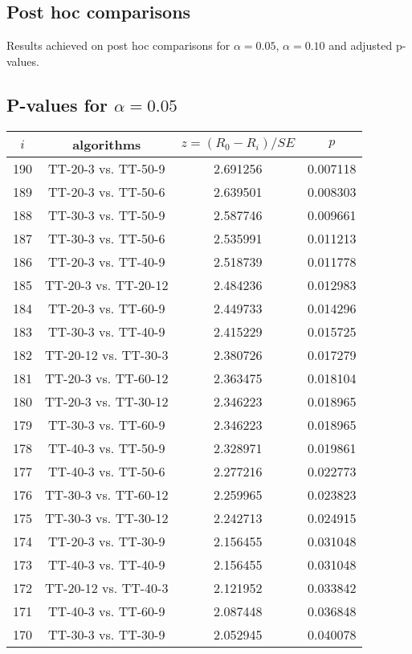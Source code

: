 \documentclass[a4paper,10pt]{article}
\begin{document}
\begin{landscape}
\section{Post hoc comparisons}

Results achieved on post hoc comparisons for $\alpha = 0.05$, $\alpha = 0.10$ and adjusted p-values.

\subsection{P-values for $\alpha=0.05$}

\begin{table}[!htp]
\centering\scriptsize
\begin{tabular}{cccc}
$i$&algorithms&$z=(R_0 - R_i)/SE$&$p$\\
\hline190&TT-20-3 vs. TT-50-9&2.691256&0.007118\\
189&TT-20-3 vs. TT-50-6&2.639501&0.008303\\
188&TT-30-3 vs. TT-50-9&2.587746&0.009661\\
187&TT-30-3 vs. TT-50-6&2.535991&0.011213\\
186&TT-20-3 vs. TT-40-9&2.518739&0.011778\\
185&TT-20-3 vs. TT-20-12&2.484236&0.012983\\
184&TT-20-3 vs. TT-60-9&2.449733&0.014296\\
183&TT-30-3 vs. TT-40-9&2.415229&0.015725\\
182&TT-20-12 vs. TT-30-3&2.380726&0.017279\\
181&TT-20-3 vs. TT-60-12&2.363475&0.018104\\
180&TT-20-3 vs. TT-30-12&2.346223&0.018965\\
179&TT-30-3 vs. TT-60-9&2.346223&0.018965\\
178&TT-40-3 vs. TT-50-9&2.328971&0.019861\\
177&TT-40-3 vs. TT-50-6&2.277216&0.022773\\
176&TT-30-3 vs. TT-60-12&2.259965&0.023823\\
175&TT-30-3 vs. TT-30-12&2.242713&0.024915\\
174&TT-20-3 vs. TT-30-9&2.156455&0.031048\\
173&TT-40-3 vs. TT-40-9&2.156455&0.031048\\
172&TT-20-12 vs. TT-40-3&2.121952&0.033842\\
171&TT-40-3 vs. TT-60-9&2.087448&0.036848\\
170&TT-30-3 vs. TT-30-9&2.052945&0.040078\\

\end{tabular}
\end{table}
\end{landscape}
\end{document}

